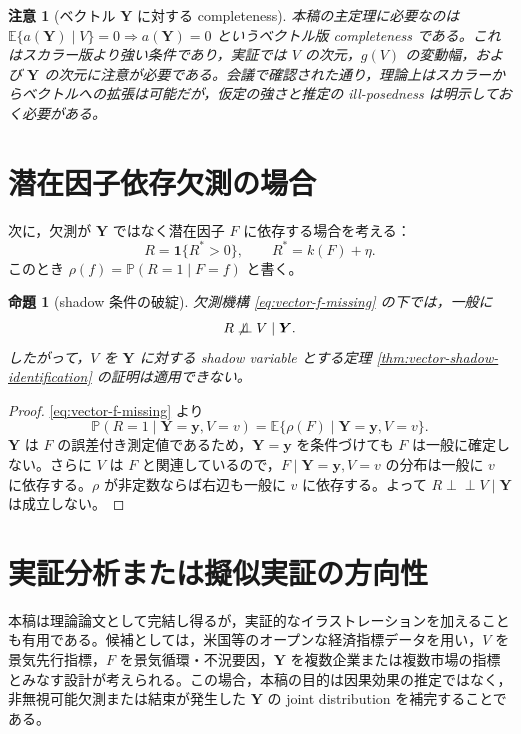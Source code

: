 \documentclass[dvipdfmx,autodetect-engine]{jsarticle}
\newtheorem{proposition}{命題}
\newtheorem{remark}{注意}
\newcommand{\indep}{\mathrel{\perp\!\!\!\perp}}
\newcommand{\E}{\mathbb{E}}
\newcommand{\Prb}{\mathbb{P}}
\newcommand{\1}{\mathbf{1}}
\newcommand{\Y}{\bm{Y}}
\begin{document}
\begin{remark}[ベクトル $\Y$ に対する completeness]
本稿の主定理に必要なのは $\E\{a(\Y)\mid V\}=0\Rightarrow a(\Y)=0$ というベクトル版 completeness である。これはスカラー版より強い条件であり，実証では $V$ の次元，$g(V)$ の変動幅，および $\Y$ の次元に注意が必要である。会議で確認された通り，理論上はスカラーからベクトルへの拡張は可能だが，仮定の強さと推定の ill-posedness は明示しておく必要がある。
\end{remark}

\section{潜在因子依存欠測の場合}

次に，欠測が $\Y$ ではなく潜在因子 $F$ に依存する場合を考える：
\begin{equation}
  R=\1\{R^*>0\},
  \qquad
  R^*=k(F)+\eta.
  \label{eq:vector-f-missing}
\end{equation}
このとき $\rho(f)=\Prb(R=1\mid F=f)$ と書く。

\begin{proposition}[shadow 条件の破綻]
\label{prop:vector-f-missing-not-shadow}
欠測機構 \eqref{eq:vector-f-missing} の下では，一般に
\begin{equation}
  R\not\indep V\mid \Y.
\end{equation}
したがって，$V$ を $\Y$ に対する shadow variable とする定理 \ref{thm:vector-shadow-identification} の証明は適用できない。
\end{proposition}

\begin{proof}
\eqref{eq:vector-f-missing} より
\begin{equation}
  \Prb(R=1\mid \Y=\bm y,V=v)=\E\{\rho(F)\mid \Y=\bm y,V=v\}.
\end{equation}
$\Y$ は $F$ の誤差付き測定値であるため，$\Y=\bm y$ を条件づけても $F$ は一般に確定しない。さらに $V$ は $F$ と関連しているので，$F\mid \Y=\bm y,V=v$ の分布は一般に $v$ に依存する。$\rho$ が非定数ならば右辺も一般に $v$ に依存する。よって $R\indep V\mid \Y$ は成立しない。
\end{proof}

\section{実証分析または擬似実証の方向性}

本稿は理論論文として完結し得るが，実証的なイラストレーションを加えることも有用である。候補としては，米国等のオープンな経済指標データを用い，$V$ を景気先行指標，$F$ を景気循環・不況要因，$\Y$ を複数企業または複数市場の指標とみなす設計が考えられる。この場合，本稿の目的は因果効果の推定ではなく，非無視可能欠測または結束が発生した $\Y$ の joint distribution を補完することである。
\end{document}

